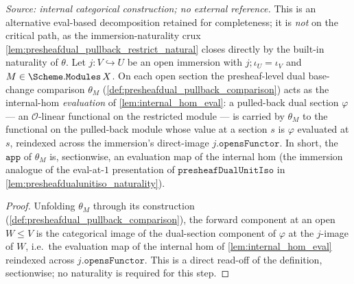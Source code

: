 \begin{lemma}

  \label{lem:presheafdual_pullback_comparison_eval_apply}
  \textit{Source: internal categorical construction; no external reference.}
  This is an alternative eval-based decomposition retained for completeness; it is \emph{not} on the
  critical path, as the immersion-naturality crux \cref{lem:presheafdual_pullback_restrict_natural}
  closes directly by the built-in naturality of \(\theta\).
  Let \(j : V \hookrightarrow U\) be an open immersion with \(j \mathbin{;} \iota_U = \iota_V\) and
  \(M \in \Scheme.\mathtt{Modules}\,X\). On each open section the presheaf-level dual base-change
  comparison \(\theta_M\) (\cref{def:presheafdual_pullback_comparison})
  acts as the internal-hom \emph{evaluation} of \cref{lem:internal_hom_eval}: a pulled-back dual
  section \(\varphi\) --- an \(\mathcal{O}\)-linear functional on the restricted module --- is carried
  by \(\theta_M\) to the functional on the pulled-back module whose value at a section \(s\) is
  \(\varphi\) evaluated at \(s\), reindexed across the immersion's direct-image
  \(j.\mathtt{opensFunctor}\). In short, the \(\mathtt{app}\) of \(\theta_M\) is, sectionwise, an
  evaluation map of the internal hom (the immersion analogue of the eval-at-\(1\) presentation of
  \(\mathtt{presheafDualUnitIso}\) in \cref{lem:presheafdualunitiso_naturality}).
\end{lemma}
\begin{proof}
  \leanok
  Unfolding \(\theta_M\) through its construction (\cref{def:presheafdual_pullback_comparison}), the forward
  component at an open \(W \le V\) is the categorical image of the dual-section component of
  \(\varphi\) at the \(j\)-image of \(W\), i.e.\ the evaluation map of the internal hom of
  \cref{lem:internal_hom_eval} reindexed across \(j.\mathtt{opensFunctor}\). This is a direct
  read-off of the definition, sectionwise; no naturality is required for this step.
\end{proof}

